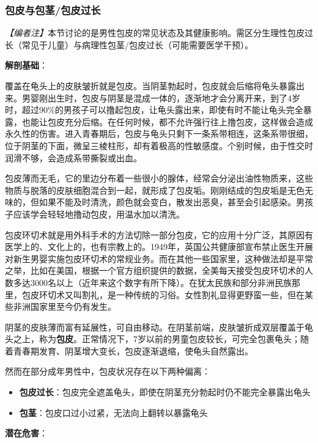 \subsubsection{包皮与包茎/包皮过长}

\noindent\textit{【编者注】}本节讨论的是男性包皮的常见状态及其健康影响。需区分生理性包皮过长（常见于儿童）与病理性包茎/包皮过长（可能需要医学干预）。

\vspace{0.5em}
\noindent\textbf{解剖基础}：

覆盖在龟头上的皮肤皱折就是包皮。当阴茎勃起时，包皮就会后缩将龟头暴露出来。男婴刚出生时，包皮与阴茎是混成一体的，逐渐地才会分离开来，到了4岁时，超过90\%的男孩子可以撸起包皮，让龟头露出来，即使有时不能让龟头完全暴露，也能让包皮充分后缩。在任何时候，都不允许强行往上撸包皮，这样做会造成永久性的伤害。进入青春期后，包皮与龟头只剩下一条系带相连，这条系带很细，位于阴茎的下面，微呈三棱柱形，却有着极高的性敏感度。个别时候，由于性交时润滑不够，会造成系带撕裂或出血。

包皮薄而无毛，它的里边分布着一些很小的腺体，经常会分泌出油性物质来，这些物质与脱落的皮肤细胞混合到一起，就形成了包皮垢。刚刚结成的包皮垢是无色无味的，但如果不能及时清洗，颜色就会变白，散发出恶臭，甚至会引起感染。男孩子应该学会轻轻地撸动包皮，用温水加以清洗。

包皮环切术就是用外科手术的方法切除一部分包皮，它的应用十分广泛，其原因有医学上的、文化上的，也有宗教上的。1949年，英国公共健康部宣布禁止医生开展对新生男婴实施包皮环切术的常规业务。而在其他一些国家里，这种做法却是平常之举，比如在美国，根据一个官方组织提供的数据，全美每天接受包皮环切术的人数多达3000名以上（近年来这个数字有所下降）。在犹太民族和部分非洲民族那里，包皮环切术又叫割礼，是一种传统的习俗。女性割礼显得更野蛮一些，但在某些非洲国家里至今仍有发生。

阴茎的皮肤薄而富有延展性，可自由移动。在阴茎前端，皮肤皱折成双层覆盖于龟头之上，称为\textbf{包皮}。正常情况下，7岁以前的男童包皮较长，可完全包裹龟头；随着青春期发育、阴茎增大变长，包皮逐渐退缩，使龟头自然露出。

然而在部分成年男性中，包皮状况存在以下两种偏离：

\begin{itemize}
	\item \textbf{包皮过长}：包皮完全遮盖龟头，即使在阴茎充分勃起时仍不能完全暴露出龟头
	\item \textbf{包茎}：包皮口过小过紧，无法向上翻转以暴露龟头
\end{itemize}

\vspace{0.5em}
\noindent\textbf{潜在危害}：

